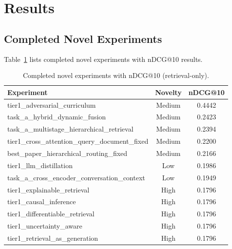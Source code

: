 \documentclass[conference]{IEEEtran}
\begin{document}
\section{Results}
\subsection{Completed Novel Experiments}
Table~\ref{tab:completed} lists completed novel experiments with nDCG@10 results.
\begin{table}[!t]
\centering
\small
\begin{tabular}{lcc}
\toprule
\textbf{Experiment} & \textbf{Novelty} & \textbf{nDCG@10} \\
\midrule
tier1\_adversarial\_curriculum & Medium & 0.4442 \\
task\_a\_hybrid\_dynamic\_fusion & Medium & 0.2423 \\
task\_a\_multistage\_hierarchical\_retrieval & Medium & 0.2394 \\
tier1\_cross\_attention\_query\_document\_fixed & Medium & 0.2200 \\
best\_paper\_hierarchical\_routing\_fixed & Medium & 0.2166 \\
tier1\_llm\_distillation & Low & 0.1986 \\
task\_a\_cross\_encoder\_conversation\_context & Low & 0.1949 \\
tier1\_explainable\_retrieval & High & 0.1796 \\
tier1\_causal\_inference & High & 0.1796 \\
tier1\_differentiable\_retrieval & High & 0.1796 \\
tier1\_uncertainty\_aware & High & 0.1796 \\
tier1\_retrieval\_as\_generation & High & 0.1796 \\
\bottomrule
\end{tabular}
\caption{Completed novel experiments with nDCG@10 (retrieval-only).}
\label{tab:completed}
\end{table}
\end{document}
